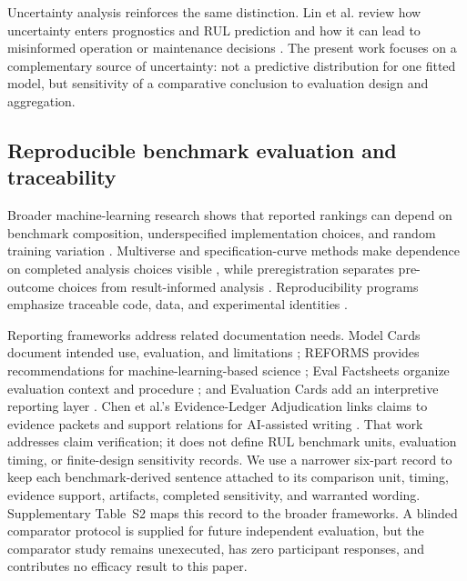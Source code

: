 \documentclass[preprint,12pt,numbers,sort&compress]{elsarticle}
\begin{document}
Uncertainty analysis reinforces the same distinction. Lin et al. review how uncertainty enters prognostics and RUL prediction and how it can lead to misinformed operation or maintenance decisions \citep{Lin2026RULUncertaintyReview}. The present work focuses on a complementary source of uncertainty: not a predictive distribution for one fitted model, but sensitivity of a comparative conclusion to evaluation design and aggregation.

\subsection{Reproducible benchmark evaluation and traceability}

Broader machine-learning research shows that reported rankings can depend on benchmark composition, underspecified implementation choices, and random training variation \citep{Dehghani2021BenchmarkLottery,DAmour2022Underspecification,Bouthillier2021Variance}. Multiverse and specification-curve methods make dependence on completed analysis choices visible \citep{Steegen2016Multiverse,Simonsohn2020Specification}, while preregistration separates pre-outcome choices from result-informed analysis \citep{Nosek2018Preregistration,Simmons2011FalsePositive}. Reproducibility programs emphasize traceable code, data, and experimental identities \citep{Pineau2021Reproducibility}.

Reporting frameworks address related documentation needs. Model Cards document intended use, evaluation, and limitations \citep{Mitchell2019ModelCards}; REFORMS provides recommendations for machine-learning-based science \citep{Kapoor2024REFORMS}; Eval Factsheets organize evaluation context and procedure \citep{Bordes2025EvalFactsheets}; and Evaluation Cards add an interpretive reporting layer \citep{Ghosh2026EvaluationCards}. Chen et al.'s Evidence-Ledger Adjudication links claims to evidence packets and support relations for AI-assisted writing \citep{Chen2026EvidenceLedger}. That work addresses claim verification; it does not define RUL benchmark units, evaluation timing, or finite-design sensitivity records. We use a narrower six-part record to keep each benchmark-derived sentence attached to its comparison unit, timing, evidence support, artifacts, completed sensitivity, and warranted wording. Supplementary Table~S2 maps this record to the broader frameworks. A blinded comparator protocol is supplied for future independent evaluation, but the comparator study remains unexecuted, has zero participant responses, and contributes no efficacy result to this paper.
\end{document}
